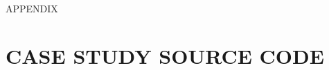 \documentclass[SDSUThesis.tex]{subfiles}
\begin{document}
\newpage

\appendix
\label{appendix}
\begin{center}
APPENDIX\\
\end{center}




\section{CASE STUDY SOURCE CODE} 
\label{app:case}
\end{document}
